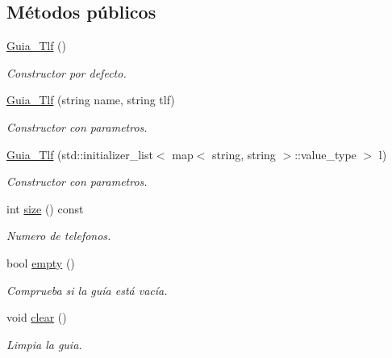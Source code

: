 \subsection*{Métodos públicos}
\begin{DoxyCompactItemize}
\item 
\mbox{\label{classGuia__Tlf_a572afdc932a0e49d3cd9392a9f869f28}} 
\hyperlink{classGuia__Tlf_a572afdc932a0e49d3cd9392a9f869f28}{Guia\+\_\+\+Tlf} ()
\begin{DoxyCompactList}\small\item\em Constructor por defecto. \end{DoxyCompactList}\item 
\hyperlink{classGuia__Tlf_ae219c6c3261fecbdc5c17ca51b26d036}{Guia\+\_\+\+Tlf} (string name, string tlf)
\begin{DoxyCompactList}\small\item\em Constructor con parametros. \end{DoxyCompactList}\item 
\hyperlink{classGuia__Tlf_a49f8340d8bd75335586a88a38507af84}{Guia\+\_\+\+Tlf} (std\+::initializer\+\_\+list$<$ map$<$ string, string $>$\+::value\+\_\+type $>$ l)
\begin{DoxyCompactList}\small\item\em Constructor con parametros. \end{DoxyCompactList}\item 
int \hyperlink{classGuia__Tlf_a727ab46d490b4196a71f623644906a81}{size} () const
\begin{DoxyCompactList}\small\item\em Numero de telefonos. \end{DoxyCompactList}\item 
bool \hyperlink{classGuia__Tlf_abf231ca9dd472519d893d2de91a7a486}{empty} ()
\begin{DoxyCompactList}\small\item\em Comprueba si la guía está vacía. \end{DoxyCompactList}\item 
\mbox{\label{classGuia__Tlf_a36ac970ece51a62763bb3898159d0047}} 
void \hyperlink{classGuia__Tlf_a36ac970ece51a62763bb3898159d0047}{clear} ()
\begin{DoxyCompactList}\small\item\em Limpia la guia. \end{DoxyCompactList}\item 

\end{DoxyCompactItemize}
